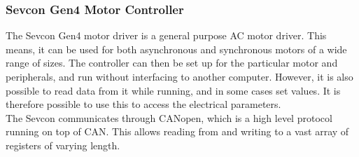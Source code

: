 \subsubsection*{Sevcon Gen4 Motor Controller}
\label{sec:interfacin_with_sevcon}

The Sevcon Gen4 motor driver is a general purpose AC motor driver. 
This means, it can be used for both asynchronous and synchronous motors of a wide range of sizes.
The controller can then be set up for the particular motor and peripherals, and run without interfacing to another computer.
However, it is also possible to read data from it while running, and in some cases set values.
It is therefore possible to use this to access the electrical parameters. \\

The Sevcon communicates through CANopen, which is a high level protocol running on top of CAN.
This allows reading from and writing to a vast array of registers of varying length.\\



